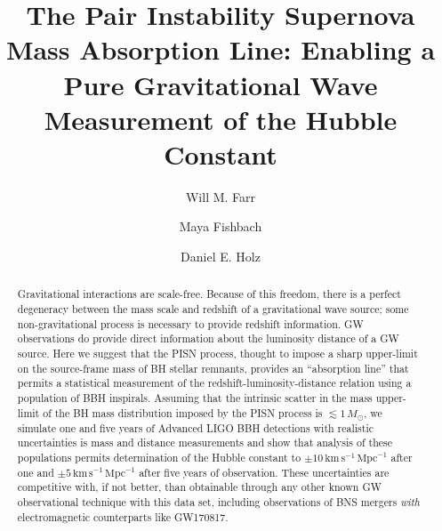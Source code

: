 \documentclass[modern]{aastex62}
\newcommand{\fiveYearUncert}{5 \, \kmsMpc}
\newcommand{\oneYearUncert}{10 \, \kmsMpc}
\newcommand{\kmsMpc}{\mathrm{km} \, \mathrm{s}^{-1} \, \mathrm{Mpc}^{-1}}
\newcommand{\MSun}{M_\odot}
\begin{document}
\title{The Pair Instability Supernova Mass Absorption Line: Enabling a Pure
Gravitational Wave Measurement of the Hubble Constant}

\author[0000-0003-1540-8562]{Will M. Farr}

\author[0000-0002-1980-5293]{Maya Fishbach}

\author[0000-0002-0175-5064]{Daniel E. Holz}

\begin{abstract}
%
  Gravitational interactions are scale-free.  Because of this freedom, there is
  a perfect degeneracy between the mass scale and redshift of a gravitational
  wave source; some non-gravitational process is necessary to provide redshift
  information. \Ac{GW} observations do provide direct information about the
  luminosity distance of a \ac{GW} source.  Here we suggest that the \ac{PISN}
  process, thought to impose a sharp upper-limit on the source-frame mass of
  \ac{BH} stellar remnants, provides an ``absorption line'' that permits a
  statistical measurement of the redshift-luminosity-distance relation using a
  population of \ac{BBH} inspirals.  Assuming that the intrinsic scatter in the
  mass upper-limit of the \ac{BH} mass distribution imposed by the \ac{PISN}
  process is $\lesssim 1\,\MSun$, we simulate one and five years of Advanced
  LIGO \ac{BBH} detections with realistic uncertainties is mass and distance
  measurements and show that analysis of these populations permits determination
  of the Hubble constant to $\pm \oneYearUncert$ after one and $\pm
  \fiveYearUncert$ after five years of observation.  These uncertainties are
  competitive with, if not better, than obtainable through any other known
  \ac{GW} observational technique with this data set, including observations of
  \ac{BNS} mergers \emph{with} electromagnetic counterparts like GW170817.
%
\end{abstract}
\end{document}
